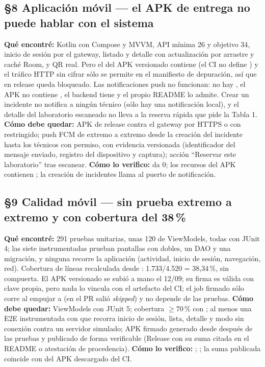 \subsection*{\S8 Aplicaci\'on m\'ovil --- el APK de entrega no puede hablar con el sistema}
\textbf{Qu\'e encontr\'e:} Kotlin con Compose y MVVM, API m\'inima 26 y objetivo 34, inicio de sesi\'on por el gateway, listado y detalle con actualizaci\'on por arrastre y cach\'e Room, y QR real. Pero el  del APK versionado contiene  (el CI no define ) y el tr\'afico HTTP sin cifrar s\'olo se permite en el manifiesto de depuraci\'on, as\'i que en release queda bloqueado. Las notificaciones push no funcionan: no hay , el APK no contiene , el backend tiene  y el propio README lo admite. Crear un incidente no notifica a ning\'un t\'ecnico (s\'olo hay una notificaci\'on local), y el detalle del laboratorio escaneado no lleva a la reserva r\'apida que pide la Tabla 1. \textbf{C\'omo debe quedar:} APK de release contra el gateway por HTTPS o con  restringido; push FCM de extremo a extremo desde la creaci\'on del incidente hasta los t\'ecnicos con permiso, con evidencia versionada (identificador del mensaje enviado, registro del dispositivo y captura); acci\'on ``Reservar este laboratorio'' tras escanear. \textbf{C\'omo lo verifico:}  da 0; los recursos del APK contienen ; la creaci\'on de incidentes llama al puerto de notificaci\'on.

\subsection*{\S9 Calidad m\'ovil --- sin prueba extremo a extremo y con cobertura del 38\,\%}
\textbf{Qu\'e encontr\'e:} 291 pruebas unitarias, unas 120 de ViewModels, todas con JUnit 4; las siete instrumentadas prueban pantallas con dobles, un DAO y una migraci\'on, y ninguna recorre la aplicaci\'on (actividad, inicio de sesi\'on, navegaci\'on, red). Cobertura de l\'ineas recalculada desde : 1.733/4.520 = 38,34\,\%, sin compuerta. El APK versionado se subi\'o a mano el 12/09; su firma es v\'alida con clave propia, pero nada lo vincula con el artefacto del CI; el job firmado s\'olo corre al empujar a  (en el PR sali\'o \emph{skipped}) y no depende de las pruebas. \textbf{C\'omo debe quedar:} ViewModels con JUnit 5; cobertura $\ge$70\,\% con ; al menos una E2E instrumentada con  que recorra inicio de sesi\'on, lista, detalle y modo sin conexi\'on contra un servidor simulado; APK firmado generado desde  despu\'es de las pruebas y publicado de forma verificable (Release con su suma citada en el README o atestaci\'on de procedencia). \textbf{C\'omo lo verifico:} ; ; la suma publicada coincide con  del APK descargado del CI.


